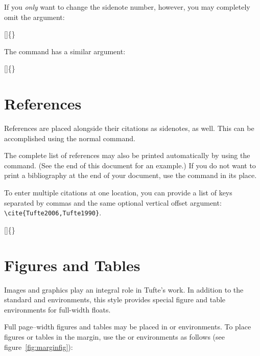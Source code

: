 If you \emph{only} want to change the sidenote number, however, you may
completely omit the  argument:
\begin{docspec}
	[]\{\}
\end{docspec}

The  command has a similar  argument:
\begin{docspec}
	[]\{\}
\end{docspec}

\section{References}
References are placed alongside their citations as sidenotes,
as well.  This can be accomplished using the normal 
command.

The complete list of references may also be printed automatically by using
the  command.  (See the end of this document for an
example.)  If you do not want to print a bibliography at the end of your
document, use the  command in its place.  

To enter multiple citations at one location,\cite[-3\baselineskip]{Tufte2006,Tufte1990} you can
provide a list of keys separated by commas and the same optional vertical
offset argument: \Verb|\cite{Tufte2006,Tufte1990}|.  
\begin{docspec}
	[]\{\}
\end{docspec}

\section{Figures and Tables}\label{sec:figures-and-tables}
Images and graphics play an integral role in Tufte's work.
In addition to the standard  and  environments,
this style provides special figure and table environments for full-width
floats.

Full page--width figures and tables may be placed in  or
 environments.  To place figures or tables in the margin,
use the  or  environments as follows
(see figure~\ref{fig:marginfig}):

